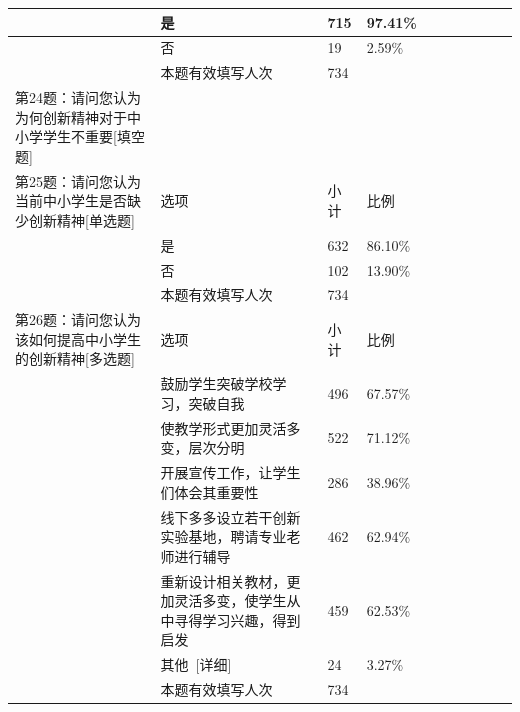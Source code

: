 \documentclass[12pt,UTF8]{ctexart}
\begin{document}
{\begin{spacing}{01}
\begin{longtable}{p{3.5cm}p{2cm}p{1.5cm}p{1.5cm}p{1.5cm}p{1.5cm}p{1.5cm}p{1cm}}
			~ & 是 & 715 & 97.41\% & ~ & ~ & ~ & ~ \\ \hline
			~ & 否 & 19 & 2.59\% & ~ & ~ & ~ & ~ \\ \hline
			~ & 本题有效填写人次 & 734 & ~ & ~ & ~ & ~ & ~ \\ \hline
			第24题：请问您认为为何创新精神对于中小学学生不重要[填空题] & ~ & ~ & ~ & ~ & ~ & ~ & ~ \\ \hline
			第25题：请问您认为当前中小学生是否缺少创新精神[单选题] & 选项 & 小计 & 比例 & ~ & ~ & ~ & ~ \\ \hline
			~ & 是 & 632 & 86.10\% & ~ & ~ & ~ & ~ \\ \hline
			~ & 否 & 102 & 13.90\% & ~ & ~ & ~ & ~ \\ \hline
			~ & 本题有效填写人次 & 734 & ~ & ~ & ~ & ~ & ~ \\ \hline
			第26题：请问您认为该如何提高中小学生的创新精神[多选题] & 选项 & 小计 & 比例 & ~ & ~ & ~ & ~ \\ \hline
			~ & 鼓励学生突破学校学习，突破自我 & 496 & 67.57\% & ~ & ~ & ~ & ~ \\ \hline
			~ & 使教学形式更加灵活多变，层次分明 & 522 & 71.12\% & ~ & ~ & ~ & ~ \\ \hline
			~ & 开展宣传工作，让学生们体会其重要性 & 286 & 38.96\% & ~ & ~ & ~ & ~ \\ \hline
			~ & 线下多多设立若干创新实验基地，聘请专业老师进行辅导 & 462 & 62.94\% & ~ & ~ & ~ & ~ \\ \hline
			~ & 重新设计相关教材，更加灵活多变，使学生从中寻得学习兴趣，得到启发 & 459 & 62.53\% & ~ & ~ & ~ & ~ \\ \hline
			~ & 其他 [详细] & 24 & 3.27\% & ~ & ~ & ~ & ~ \\ \hline
			~ & 本题有效填写人次 & 734 & ~ & ~ & ~ & ~ & ~ \\ \hline
		\end{longtable}
	\end{spacing}
	
}

\newpage
\end{document}
